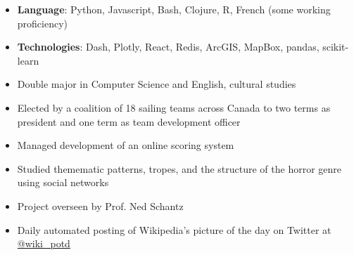\begin{itemize}
\item \textbf{Language}: Python, Javascript, Bash, Clojure, R, French (some working proficiency)
\item \textbf{Technologies}: Dash, Plotly, React, Redis, ArcGIS, MapBox, pandas, scikit-learn
\end{itemize}

\begin{itemize}
\item Double major in Computer Science and English, cultural studies
\end{itemize}

\begin{itemize}
\item Elected by a coalition of 18 sailing teams across Canada to two terms as president and one term as team development officer \item Managed development of an online scoring system
\end{itemize}

\begin{itemize}
\item  Studied themematic patterns, tropes, and the structure of the horror genre using social networks
\item Project overseen by Prof. Ned Schantz
\end{itemize}
\begin{itemize}
\item Daily automated posting of Wikipedia's picture of the day on Twitter at \href{http://twitter.com/wiki_potd}{@wiki\_potd}
\end{itemize}


